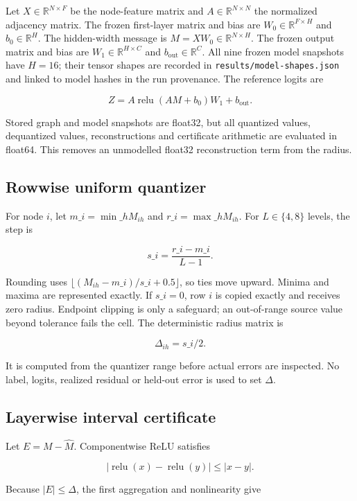 \documentclass{article}
\begin{document}
Let \(X\in\mathbb R^{N\times F}\) be the node-feature matrix and \(A\in\mathbb R^{N\times N}\) the normalized adjacency matrix. The frozen first-layer matrix and bias are \(W_0\in\mathbb R^{F\times H}\) and \(b_0\in\mathbb R^H\). The hidden-width message is \(M=XW_0\in\mathbb R^{N\times H}\). The frozen output matrix and bias are \(W_1\in\mathbb R^{H\times C}\) and \(b_{\mathrm{out}}\in\mathbb R^C\). All nine frozen model snapshots have \(H=16\); their tensor shapes are recorded in \texttt{results/model-shapes.json} and linked to model hashes in the run provenance. The reference logits are

\[
Z=A\operatorname{relu}(AM+b_0)W_1+b_{\mathrm{out}}.
\]

Stored graph and model snapshots are float32, but all quantized values, dequantized values, reconstructions and certificate arithmetic are evaluated in float64. This removes an unmodelled float32 reconstruction term from the radius.

\subsection{Rowwise uniform quantizer}


For node \(i\), let \(m\_i=\min\_h M_{ih}\) and \(r\_i=\max\_h M_{ih}\). For \(L\in\{4,8\}\) levels, the step is

\[
s\_i=\frac{r\_i-m\_i}{L-1}.
\]

Rounding uses \(\lfloor (M_{ih}-m\_i)/s\_i+0.5\rfloor\), so ties move upward. Minima and maxima are represented exactly. If \(s\_i=0\), row \(i\) is copied exactly and receives zero radius. Endpoint clipping is only a safeguard; an out-of-range source value beyond tolerance fails the cell. The deterministic radius matrix is

\[
\Delta_{ih}=s\_i/2.
\]

It is computed from the quantizer range before actual errors are inspected. No label, logits, realized residual or held-out error is used to set \(\Delta\).

\subsection{Layerwise interval certificate}


Let \(E=M-\widehat M\). Componentwise ReLU satisfies

\[
|\operatorname{relu}(x)-\operatorname{relu}(y)|\le |x-y|.
\]

Because \(|E|\le\Delta\), the first aggregation and nonlinearity give
\end{document}
